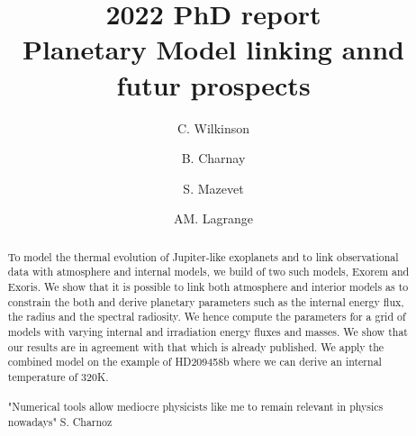 \begin{frontmatter}
%
\title{%
2022 PhD report\\
\small Planetary Model linking annd futur prospects  %
}
%
\author[Observatoire de Paris-Meudon]{C. Wilkinson} 
\author[Observatoire de Paris-Meudon]{B. Charnay}
\author[Observatory De La Côte D'azur]{S. Mazevet}
\author[Observatoire de Paris-Meudon]{AM. Lagrange}
\address[Observatoire de Paris-Meudon]{Obsrvatoire de Paris-Meudon - Lesia}
\address[Observatory De La Côte D'azur]{Observatory De La Côte D'azur}
%
%
\renewcommand*{\today}{\MonthYearDateFormat\displaydate{dateName}} 
%
\begin{abstract}
To model the thermal evolution of Jupiter-like exoplanets and to link observational data with atmosphere and internal models, we build of two such models, Exorem and Exoris. We show that it is possible to link both atmosphere and interior models as to constrain the both and derive planetary parameters such as the internal energy flux, the radius and the spectral radiosity. We hence compute the parameters for a grid of models with varying internal and irradiation energy fluxes and masses. We show that our results are in agreement with that which is already published. We apply the combined model on the example of HD209458b where we can derive an internal temperature of 320K.\\
\\
"Numerical tools allow mediocre physicists like me to remain relevant in physics nowadays" S. Charnoz

\end{abstract}
%
\end{frontmatter}
%
%
%

